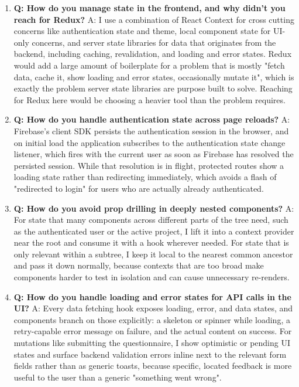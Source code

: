 \documentclass[11pt,a4paper]{report}
\begin{document}
\begin{enumerate}[leftmargin=*]
\item \textbf{Q: How do you manage state in the frontend, and why didn't you reach for Redux?}
A: I use a combination of React Context for cross cutting concerns like authentication state and theme, local component state for UI-only concerns, and server state libraries for data that originates from the backend, including caching, revalidation, and loading and error states. Redux would add a large amount of boilerplate for a problem that is mostly "fetch data, cache it, show loading and error states, occasionally mutate it", which is exactly the problem server state libraries are purpose built to solve. Reaching for Redux here would be choosing a heavier tool than the problem requires.

\item \textbf{Q: How do you handle authentication state across page reloads?}
A: Firebase's client SDK persists the authentication session in the browser, and on initial load the application subscribes to the authentication state change listener, which fires with the current user as soon as Firebase has resolved the persisted session. While that resolution is in flight, protected routes show a loading state rather than redirecting immediately, which avoids a flash of "redirected to login" for users who are actually already authenticated.

\item \textbf{Q: How do you avoid prop drilling in deeply nested components?}
A: For state that many components across different parts of the tree need, such as the authenticated user or the active project, I lift it into a context provider near the root and consume it with a hook wherever needed. For state that is only relevant within a subtree, I keep it local to the nearest common ancestor and pass it down normally, because contexts that are too broad make components harder to test in isolation and can cause unnecessary re-renders.

\item \textbf{Q: How do you handle loading and error states for API calls in the UI?}
A: Every data fetching hook exposes loading, error, and data states, and components branch on those explicitly: a skeleton or spinner while loading, a retry-capable error message on failure, and the actual content on success. For mutations like submitting the questionnaire, I show optimistic or pending UI states and surface backend validation errors inline next to the relevant form fields rather than as generic toasts, because specific, located feedback is more useful to the user than a generic "something went wrong".


\end{enumerate}
\end{document}
